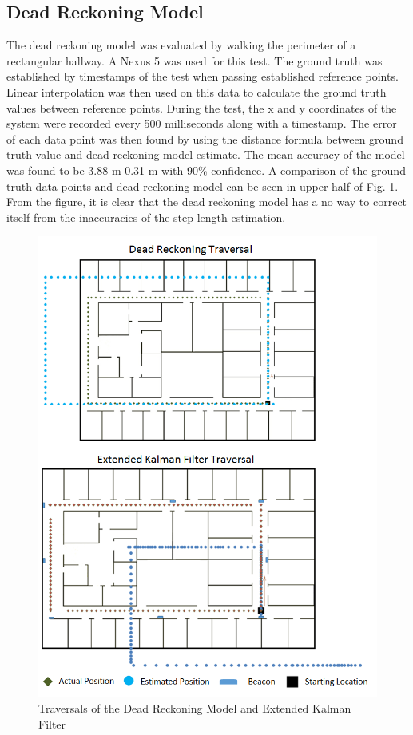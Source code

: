 \documentclass[conference]{IEEEtran}
\begin{document}
\subsection{Dead Reckoning Model}

The dead reckoning model was evaluated by walking the perimeter of a rectangular hallway. A Nexus 5 was used for this test. The ground truth was established by timestamps of the test when passing established reference points. Linear interpolation was then used on this data to calculate the ground truth values between reference points. During the test, the x and y coordinates of the system were recorded every 500 milliseconds along with a timestamp. The error of each data point was then found by using the distance formula between ground truth value and dead reckoning model estimate. The mean accuracy of the model was found to be 3.88 m  0.31 m with 90\% confidence. A comparison of the ground truth data points and dead reckoning model can be seen in upper half of Fig. \ref{fig:traversalmap}. From the figure, it is clear that the dead reckoning model has a no way to correct itself from the inaccuracies of the step length estimation.

\begin{figure}[]
\centering
\includegraphics[scale=0.5]{TraversalMap.png}
\caption{Traversals of the Dead Reckoning Model and Extended Kalman Filter}
\captionsetup{justification=centering,margin=2cm}
\label{fig:traversalmap}
\end{figure}
\end{document}
